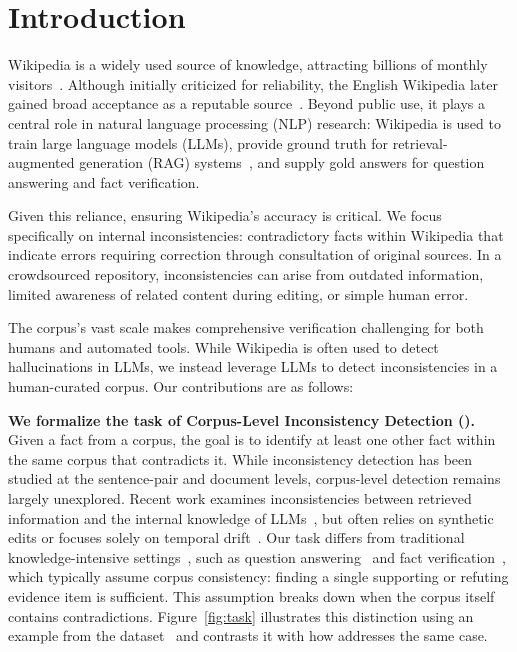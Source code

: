 \section{Introduction}
\label{sec:introduction}

Wikipedia is a widely used source of knowledge, attracting billions of monthly visitors~\citep{statista_wikipedia_traffic_2024}. Although initially criticized for reliability, the English Wikipedia later gained broad acceptance as a reputable source~\citep{economist_wikipedia_2021}. Beyond public use, it plays a central role in natural language processing (NLP) research: Wikipedia is used to train large language models (LLMs), provide ground truth for retrieval-augmented generation (RAG) systems~\citep{semnani-etal-2023-wikichat, lewis2020retrieval, guu2020realm, zhang-etal-2024-spaghetti}, and supply gold answers for question answering and fact verification.

Given this reliance, ensuring Wikipedia's accuracy is critical. We focus specifically on internal inconsistencies: contradictory facts within Wikipedia that indicate errors requiring correction through consultation of original sources. In a crowdsourced repository, inconsistencies can arise from outdated information, limited awareness of related content during editing, or simple human error.

The corpus's vast scale makes comprehensive verification challenging for both humans and automated tools.
While Wikipedia is often used to detect hallucinations in LLMs, we instead leverage LLMs to detect inconsistencies in a human-curated corpus.
Our contributions are as follows:

\textbf{We formalize the task of Corpus-Level Inconsistency Detection (\task).} Given a fact from a corpus, the goal is to identify at least one other fact within the same corpus that contradicts it. While inconsistency detection has been studied at the sentence-pair and document levels, corpus-level detection remains largely unexplored. Recent work examines inconsistencies between retrieved information and the internal knowledge of LLMs~\citep{su2024textttconflictbank, jin2024tugofwar, xie2023adaptive, wang2025retrievalaugmented}, but often relies on synthetic edits or focuses solely on temporal drift~\citep{marjanovic-etal-2024-dynamicqa}. Our task differs from traditional knowledge-intensive settings~\citep{petroni-etal-2021-kilt}, such as question answering~\citep{kwiatkowski-etal-2019-natural, joshi-etal-2017-triviaqa} and fact verification~\citep{thorne-etal-2018-fever, jiang-etal-2020-hover}, which typically assume corpus consistency: finding a single supporting or refuting evidence item is sufficient. This assumption breaks down when the corpus itself contains contradictions. Figure~\ref{fig:task} illustrates this distinction using an example from the \feverous dataset~\cite{aly-etal-2021-fact} and contrasts it with how \system addresses the same case.

